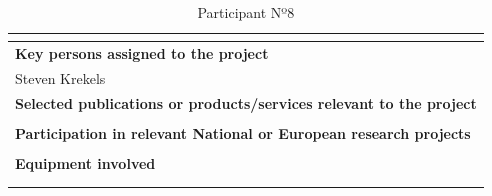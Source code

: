 \begin{longtable}[H]{|p{0.7cm}|p{4cm}|p{7cm}|p{1.3cm}|}
	\multicolumn{4}{|p{13cm}|}{}  \\ \hline
	
	\multicolumn{4}{|p{13cm}|}{\textbf{Key persons assigned to the project}}   \\ \hline
	
	\multicolumn{4}{|p{13cm}|}{Steven Krekels}  \\ \hline
	
	\multicolumn{4}{|p{13cm}|}{\textbf{Selected publications or products/services relevant to the project}}  \\ \hline
	
	\multicolumn{4}{|p{13cm}|}{}  \\ \hline
	
	\multicolumn{4}{|p{13cm}|}{\textbf{Participation in relevant National or European research projects}}  \\ \hline
	
	\multicolumn{4}{|p{13cm}|}{}  \\ \hline
	
	\multicolumn{4}{|p{13cm}|}{\textbf{Equipment involved}}  \\ \hline
	
	\multicolumn{4}{|p{13cm}|}{}  \\ \hline
	\caption{Participant Nº8}
\end{longtable}